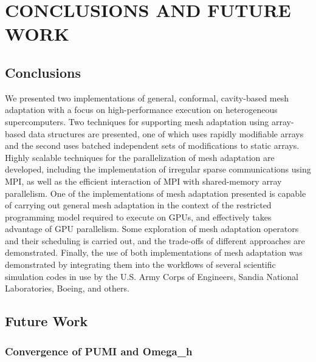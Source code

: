 
\chapter{CONCLUSIONS AND FUTURE WORK}

\section{Conclusions}

We presented two implementations of general, conformal,
cavity-based mesh adaptation with a focus on high-performance
execution on heterogeneous supercomputers.
Two techniques for supporting mesh adaptation using array-based
data structures are presented, one of which uses rapidly modifiable
arrays and the second uses batched independent sets of modifications
to static arrays.
Highly scalable techniques for the parallelization of mesh adaptation are
developed, including the implementation of irregular sparse
communications using MPI, as well as the efficient interaction of
MPI with shared-memory array parallelism.
One of the implementations of mesh adaptation presented is capable of carrying out
general mesh adaptation in the context of the restricted programming
model required to execute on GPUs, and effectively takes advantage
of GPU parallelism.
Some exploration of mesh adaptation operators and their scheduling
is carried out, and the trade-offs of different approaches are
demonstrated.
Finally, the use of both implementations of mesh adaptation was demonstrated
by integrating them into the workflows of
several scientific simulation codes in use by the U.S. Army Corps of Engineers,
Sandia National Laboratories, Boeing, and others.

\section{Future Work}

\subsection{Convergence of PUMI and Omega\_h}
\label{sec:converge}

